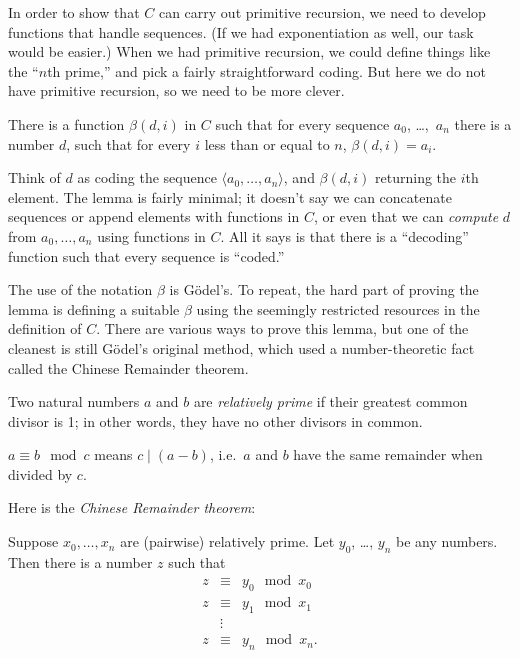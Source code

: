 \documentclass[../../../include/open-logic-section]{subfiles}
\begin{document}


In order to show that $C$ can carry out primitive recursion, we need
to develop functions that handle sequences. (If we had exponentiation
as well, our task would be easier.) When we had primitive recursion,
we could define things like the ``$n$th prime,'' and pick a fairly
straightforward coding. But here we do not have primitive recursion,
so we need to be more clever.

\begin{lem}
There is a function $\beta(d,i)$ in $C$ such that for every sequence
$a_0$, \dots,~$a_n$ there is a number $d$, such that for every $i$ less
than or equal to $n$, $\beta(d,i) = a_i$.
\end{lem}

Think of $d$ as coding the sequence $\langle a_0,\dots,a_n \rangle$, and
$\beta(d,i)$ returning the $i$th element. The lemma is fairly minimal;
it doesn't say we can concatenate sequences or append elements with
functions in $C$, or even that we can \emph{compute} $d$ from
$a_0,\dots,a_n$ using functions in $C$. All it says is that there is
a ``decoding'' function such that every sequence is ``coded.''

The use of the notation $\beta$ is G\"odel's. To repeat, the hard part
of proving the lemma is defining a suitable $\beta$ using the
seemingly restricted resources in the definition of $C$. There are
various ways to prove this lemma, but one of the cleanest is still
G\"odel's original method, which used a number-theoretic fact called
the Chinese Remainder theorem.

\begin{defn}
  Two natural numbers $a$ and $b$ are \emph{relatively prime} if their
  greatest common divisor is 1; in other words, they have no other
  divisors in common.
\end{defn}

\begin{defn}
$a \equiv b \mod c$ means $c \mid (a-b)$, i.e.\ $a$ and $b$ have the
same remainder when divided by $c$.
\end{defn}

Here is the \emph{Chinese Remainder theorem}:
\begin{thm}
Suppose $x_0,\dots,x_n$ are (pairwise) relatively prime. Let
$y_0$, \dots, $y_n$ be any numbers. Then there is a number $z$ such that
\begin{eqnarray*}
z & \equiv & y_0 \mod x_0 \\
z & \equiv & y_1 \mod x_1 \\
& \vdots & \\
z & \equiv & y_n \mod x_n.
\end{eqnarray*}
\end{thm}
\end{document}
